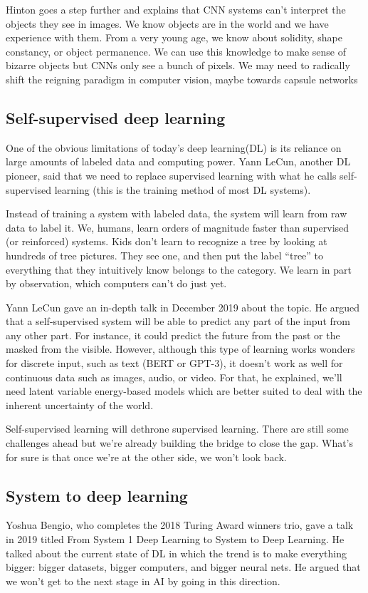 \documentclass{article}
\begin{document}
Hinton goes a step further and explains that CNN systems can’t interpret the objects they see in images. We know objects are in the world and we have experience with them. From a very young age, we know about solidity, shape constancy, or object permanence. We can use this knowledge to make sense of bizarre objects but CNNs only see a bunch of pixels. We may need to radically shift the reigning paradigm in computer vision, maybe towards capsule networks \cite{34}

\subsection{Self-supervised deep learning}
One of the obvious limitations of today's deep learning(DL) is its reliance on large amounts of labeled data and computing power. Yann LeCun, another DL pioneer, said that we need to replace supervised learning with what he calls self-supervised learning (this is the training method of most DL systems).

Instead of training a system with labeled data, the system will learn from raw data to label it. We, humans, learn orders of magnitude faster than supervised (or reinforced) systems. Kids don’t learn to recognize a tree by looking at hundreds of tree pictures. They see one, and then put the label ``tree'' to everything that they intuitively know belongs to the category. We learn in part by observation, which computers can’t do just yet.

Yann LeCun gave an in-depth talk \cite{35} in December 2019 about the topic. He argued that a self-supervised system will be able to predict any part of the input from any other part. For instance, it could predict the future from the past or the masked from the visible. However, although this type of learning works wonders for discrete input, such as text (BERT or GPT-3), it doesn’t work as well for continuous data such as images, audio, or video. For that, he explained, we’ll need latent variable energy-based models which are better suited to deal with the inherent uncertainty of the world.

Self-supervised learning will dethrone supervised learning. There are still some challenges ahead but we’re already building the bridge to close the gap. What’s for sure is that once we’re at the other side, we won’t look back.

\subsection{System to deep learning}
Yoshua Bengio, who completes the 2018 Turing Award winners trio, gave a talk in 2019 titled From System 1 Deep Learning to System to Deep Learning. He talked about the current state of DL in which the trend is to make everything bigger: bigger datasets, bigger computers, and bigger neural nets. He argued that we won’t get to the next stage in AI by going in this direction.
\end{document}
